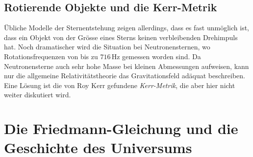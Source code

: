 \subsection{Rotierende Objekte und die Kerr-Metrik}
Übliche Modelle der Sternentstehung zeigen allerdings, dass es fast
unmöglich ist, dass ein Objekt von der Grösse eines Sterns keinen 
verbleibenden Drehimpuls hat.
Noch dramatischer wird die Situation bei Neutronensternen, wo 
Rotationsfrequenzen von bis zu $716\,\text{Hz}$ gemessen worden sind.
Da Neutronensterne auch sehr hohe Masse bei kleinen Abmessungen
aufweisen, kann nur die allgemeine Relativitätstheorie das Gravitationsfeld
adäquat beschreiben.
Eine Lösung ist die von Roy Kerr gefundene \emph{Kerr-Metrik},
die aber hier nicht weiter diskutiert wird.
%
%


%
%
\section{Die Friedmann-Gleichung und die Geschichte des Universums
\label{buch:kruemmung:section:friedmann}}




